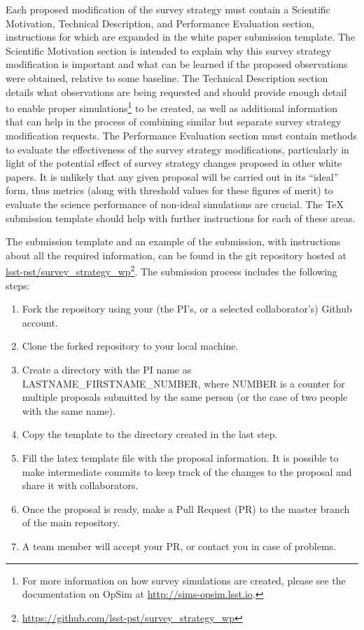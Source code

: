 \documentclass[DM,lsstdraft,toc,usenatbib]{lsstdoc}
\begin{document}
Each proposed modification of the survey strategy must contain a Scientific Motivation, Technical Description, and Performance Evaluation section, instructions for which are expanded in the white paper submission template. The Scientific Motivation section is intended to explain why this survey strategy modification is important and what can be learned if the proposed observations were obtained, relative to some baseline. The Technical Description section details what observations are being requested and should provide enough detail to enable proper simulations\footnote{For more information on how survey simulations are created, please see the documentation on OpSim at \href{http://sims-opsim.lsst.io}{http://sims-opsim.lsst.io}.} to be created, as well as additional information that can help in the process of combining similar but separate survey strategy modification requests. The Performance Evaluation section must contain methods to evaluate the effectiveness of the survey strategy modifications, particularly in light of the potential effect of survey strategy changes proposed in other white papers. It is unlikely that any given proposal will be carried out in its ``ideal'' form, thus metrics (along with threshold values for these figures of merit) to evaluate the science performance of non-ideal simulations are crucial. The TeX submission template should help with further instructions for each of these areas.

The submission template and an example of the submission, with instructions about
all the required information, can be found in the git repository hosted at \href{https://github.com/lsst-pst/survey_strategy_wp}{lsst-pst/survey\_strategy\_wp}\footnote{\url{https://github.com/lsst-pst/survey_strategy_wp}}.
The submission process includes the following steps: 
%
\begin{enumerate}
\item Fork the repository using your (the PI's, or a selected collaborator's)  Github account.
\item Clone the forked repository to your local machine.
\item Create a directory with the PI name as LASTNAME\_FIRSTNAME\_NUMBER,
where NUMBER is a counter for multiple proposals submitted by the same person (or the case
of two people with the same name). 
\item Copy the template to the directory created in the last step.
\item Fill the latex template file with the proposal information. It is possible to make intermediate 
          commits to keep track of the changes to the proposal and share it with collaborators.
\item Once the proposal is ready, make a Pull Request (PR) to the master branch of the main repository. 
\item A team member will accept your PR, or contact you in case of problems. 
\end{enumerate}
\end{document}
